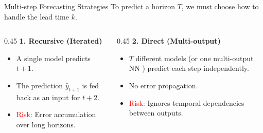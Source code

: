 \begin{frame}[allowframebreaks]{Multi-step Forecasting Strategies}
    To predict a horizon $T$, we must choose how to handle the lead time $k$.

    \vspace{1cm}
    
    \begin{columns}[T]
        \begin{column}{0.45\textwidth}
            \textbf{1. Recursive (Iterated)}
            \begin{itemize}
                \item A single model predicts $t+1$.
                \item The prediction $\hat{y}_{t+1}$ is fed back as an input for $t+2$.
                \item \textcolor{red}{Risk:} Error accumulation over long horizons.
            \end{itemize}
        \end{column}
        \begin{column}{0.45\textwidth}
            \textbf{2. Direct (Multi-output)}
            \begin{itemize}
                \item $T$ different models (or one multi-output NN ) predict each step independently.
                \item No error propagation.
                \item \textcolor{red}{Risk:} Ignores temporal dependencies between outputs.
            \end{itemize}
        \end{column}
    \end{columns}

    \vspace{0.8cm}

    \begin{center}
\end{center}
\end{frame}
